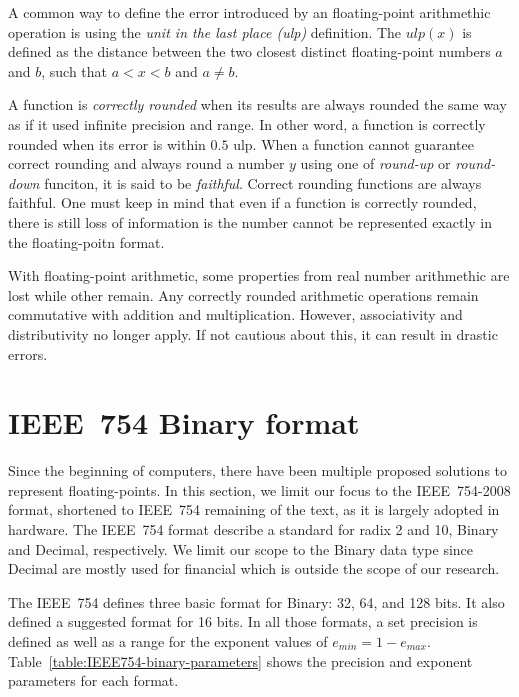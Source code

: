 A common way to define the error introduced by an floating-point arithmethic
operation is using the \textit{unit in the last place (ulp)} definition.
The $ulp(x)$ is defined as the distance between the two closest distinct
floating-point numbers $a$ and $b$, such that $a < x < b$ and $a \neq b$.

A function is \textit{correctly rounded} when its results are always rounded the 
same way as if it used infinite precision and range.
In other word, a function is correctly rounded when its error is within $0.5$ ulp.
When a function cannot guarantee correct rounding and always round a number $y$
using one of \textit{round-up} or \textit{round-down} funciton, it is said to be \textit{faithful}.
Correct rounding functions are always faithful.
One must keep in mind that even if a function is correctly rounded, there is
still loss of information is the number cannot be represented exactly in the
floating-poitn format.

With floating-point arithmetic, some properties from real number arithmethic are lost while other remain.
Any correctly rounded arithmetic operations remain commutative with addition and multiplication.
However, associativity and distributivity no longer apply.
If not cautious about this, it can result in drastic errors.


\section{IEEE~754 Binary format}
Since the beginning of computers, there have been multiple proposed solutions to represent floating-points.
In this section, we limit our focus to the IEEE~754-2008 format, shortened to IEEE~754 remaining of the text, as it is largely adopted in hardware.
The IEEE~754 format describe a standard for radix 2 and 10, Binary and Decimal, respectively.
We limit our scope to the Binary data type since Decimal are mostly used for financial which is outside the scope of our research.

The IEEE~754 defines three basic format for Binary: 32, 64, and 128 bits.
It also defined a suggested format for 16 bits.
In all those formats, a set precision is defined as well as a range for the exponent values of $e_{min} = 1 - e_{max}$.
Table~\ref{table:IEEE754-binary-parameters} shows the precision and exponent parameters for each format. 

